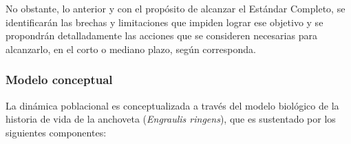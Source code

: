 \documentclass[letter,11pt]{article}
\begin{document}
No obstante, lo anterior y con el prop\'osito de alcanzar el Est\'andar
Completo, se identificar\'an las brechas y limitaciones que impiden lograr
ese objetivo y se propondr\'an detalladamente las acciones que se
consideren necesarias para alcanzarlo, en el corto o mediano plazo,
seg\'un corresponda.


\subsubsection{Modelo conceptual}

La din\'amica poblacional es conceptualizada a trav\'es del modelo biol\'ogico
de la historia de vida de la anchoveta (\textit{Engraulis ringens}), que
es sustentado por los siguientes componentes:

\begin{itemize}
\def\labelenumi{\alph{enumi}.}


\end{itemize}
\end{document}
